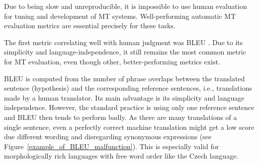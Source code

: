 \documentclass[11pt]{article}
\def\Fref#1{Figure~\ref{#1}}
\begin{document}
Due to being slow and unreproducible, it is impossible to use human evaluation
for tuning and development of MT systems. Well-performing automatic MT 
evaluation metrics are essential precisely for these tasks.

The first metric correlating well with human judgment was BLEU \cite{bleu}.
Due to its simplicity and language-independence, it still remains the most 
common metric for MT evaluation, even though other, better-performing metrics 
exist. \cite{wmt13-metrics} %



BLEU is computed from the number of phrase overlaps between the translated
sentence (hypothesis) and the corresponding reference sentences, i.e., 
translations made by a human translator. Its main advantage is its simplicity 
and language independence. However, the standard practice is using only one 
reference sentence and BLEU then tends to perform badly. As there are many 
translations of a single sentence, even a perfectly correct machine translation 
might get a low score due different wording and disregarding synonymous 
expressions (see \Fref{example_of_BLEU_malfunction}). This is especially valid 
for morphologically rich languages with free word order like the Czech 
language. \cite{bojar-tackling-sparse-data}
\end{document}
